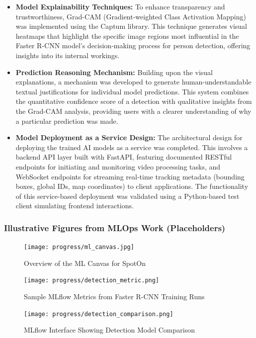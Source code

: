 \begin{itemize}
    \item \textbf{Model Explainability Techniques:} To enhance transparency and trustworthiness, Grad-CAM (Gradient-weighted Class Activation Mapping) was implemented using the Captum library. This technique generates visual heatmaps that highlight the specific image regions most influential in the Faster R-CNN model's decision-making process for person detection, offering insights into its internal workings.
    \item \textbf{Prediction Reasoning Mechanism:} Building upon the visual explanations, a mechanism was developed to generate human-understandable textual justifications for individual model predictions. This system combines the quantitative confidence score of a detection with qualitative insights from the Grad-CAM analysis, providing users with a clearer understanding of why a particular prediction was made.
    \item \textbf{Model Deployment as a Service Design:} The architectural design for deploying the trained AI models as a service was completed. This involves a backend API layer built with FastAPI, featuring documented RESTful endpoints for initiating and monitoring video processing tasks, and WebSocket endpoints for streaming real-time tracking metadata (bounding boxes, global IDs, map coordinates) to client applications. The functionality of this service-based deployment was validated using a Python-based test client simulating frontend interactions.
\end{itemize}

\subsubsection*{Illustrative Figures from MLOps Work (Placeholders)}
\begin{figure}[!htb]
    \centering
    \texttt{[image: progress/ml\_canvas.jpg]}
    \caption{Overview of the ML Canvas for SpotOn}
    \label{fig:progress_ml_canvas}
\end{figure}

\begin{figure}[!htb]
    \centering
    \texttt{[image: progress/detection\_metric.png]}
    \caption{Sample MLflow Metrics from Faster R-CNN Training Runs}
    \label{fig:progress_mlflow_training_metrics}
\end{figure}

\begin{figure}[!htb]
    \centering
    \texttt{[image: progress/detection\_comparison.png]}
    \caption{MLflow Interface Showing Detection Model Comparison}
    \label{fig:progress_mlflow_model_comparison}
\end{figure}

